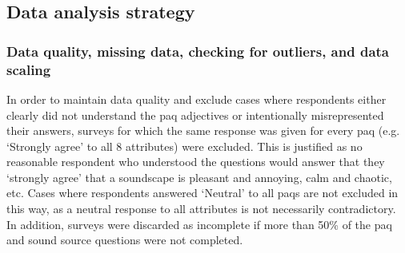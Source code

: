 


\subsection{Data analysis strategy}

\subsubsection*{Data quality, missing data, checking for outliers, and data scaling}
In order to maintain data quality and exclude cases where respondents either clearly did not understand the \gls{paq} adjectives or intentionally misrepresented their answers, surveys for which the same response was given for every \gls{paq} (e.g. `Strongly agree' to all 8 attributes) were excluded. This is justified as no reasonable respondent who understood the questions would answer that they `strongly agree' that a soundscape is pleasant and annoying, calm and chaotic, etc. Cases where respondents answered `Neutral' to all \glspl{paq} are not excluded in this way, as a neutral response to all attributes is not necessarily contradictory. In addition, surveys were discarded as incomplete if more than 50\% of the \gls{paq} and sound source questions were not completed.


